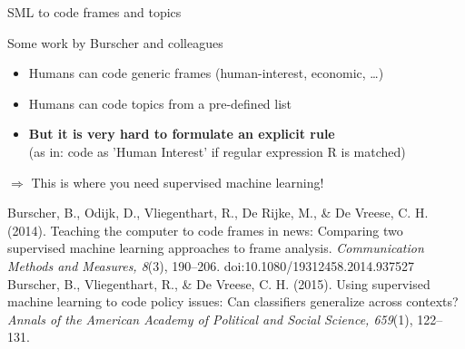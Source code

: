 \documentclass{beamer}
\begin{document}
\begin{frame}{SML to code frames and topics}
\begin{block}{Some work by Burscher and colleagues}
\begin{itemize}
\item Humans can code generic frames (human-interest, economic, \ldots)
\item Humans can code topics from a pre-defined list 
\item<2->\textbf{But it is very hard to formulate an explicit rule} \\(as in: code as 'Human Interest' if regular expression R is matched)
\end{itemize}
$\Rightarrow$ This is where you need supervised machine learning!
\end{block}
\tiny{Burscher, B., Odijk, D., Vliegenthart, R., De Rijke, M., \& De Vreese, C. H. (2014). Teaching the computer to code frames in news: Comparing two supervised machine learning approaches to frame analysis. \emph{Communication Methods and Measures, 8}(3), 190–206. doi:10.1080/19312458.2014.937527
\\
Burscher, B., Vliegenthart, R., \& De Vreese, C. H. (2015). Using supervised machine learning to code policy issues: Can classifiers generalize across contexts? \emph{Annals of the American Academy of Political and Social Science, 659}(1), 122–131.
}

\end{frame}





{
\begin{frame}[plain]
\end{frame}

\begin{frame}[plain]
\end{frame}

\begin{frame}[plain]
\end{frame}
}
\end{document}
